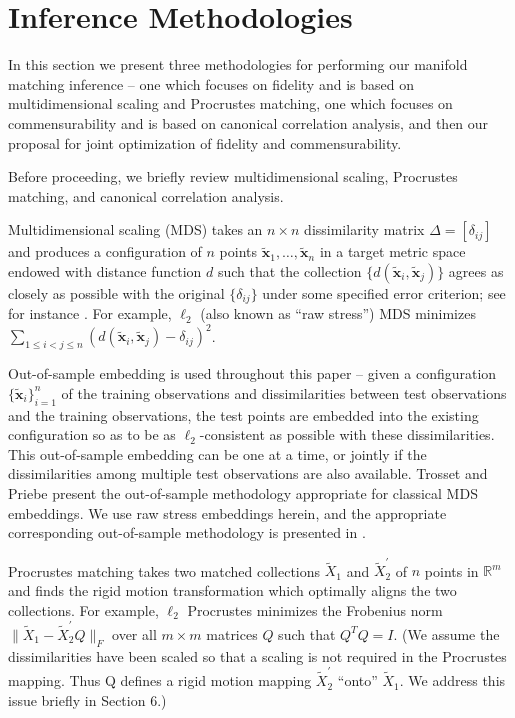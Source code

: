 \documentclass[12pt,xcolor]{article}
\newcommand{\1}{\ensuremath{\mbox{{\bf 1}}}}
\begin{document}
\section{Inference Methodologies}

In this section we present three methodologies for performing our manifold matching inference --
one which focuses on fidelity and is based on multidimensional scaling
and Procrustes matching, one which focuses on commensurability and is based on canonical correlation analysis,
and then our proposal for joint optimization of fidelity and commensurability.

Before proceeding, we briefly review multidimensional scaling, Procrustes matching, and canonical correlation analysis.

Multidimensional scaling (MDS) takes an $n \times n$ dissimilarity matrix $\Delta=[\delta_{ij}]$
and produces a configuration of $n$ points $\widetilde{\bm{x}}_1,\ldots,\widetilde{\bm{x}}_n$ in a target metric space endowed with distance function $d$
such that the collection $\{d(\widetilde{\bm{x}}_i,\widetilde{\bm{x}}_j)\}$ agrees as closely as possible with the original $\{\delta_{ij}\}$
under some specified error criterion; see for instance \cite{T52,T58,CC01,BG05}.
For example, $\ell_2$ (also known as ``raw stress'') MDS minimizes
$\sum_{1 \leq i < j \leq n} (d(\widetilde{\bm{x}}_{i},\widetilde{\bm{x}}_{j})-\delta_{ij})^2$.

Out-of-sample embedding is used throughout this paper -- given a configuration $\{\widetilde{\bm{x}}_i\}_{i=1}^n$
of the training observations
and dissimilarities between test observations and the training observations, the test points are embedded
into the existing configuration so as to be as $\ell_2$-consistent as possible with these dissimilarities.
This out-of-sample embedding can be one at a time, or jointly if the dissimilarities among multiple test observations are also available.
Trosset and Priebe \cite{TP-CSDA-2008-oos} present the out-of-sample methodology appropriate for classical MDS embeddings.
We use raw stress embeddings herein, and the appropriate corresponding out-of-sample methodology is presented in \cite{MPoos}.

Procrustes matching \cite{procrustes1,procrustes2,procrustes3,procrustes4}
takes two matched collections $\widetilde{X}_1$ and $\widetilde{X}^{\prime}_2$ of $n$ points in $\mathbb{R}^m$
and finds the rigid motion transformation which optimally aligns the two collections.
For example, $\ell_2$ Procrustes minimizes the Frobenius norm $\|\widetilde{X}_1 - \widetilde{X}^{\prime}_2Q\|_F$ over all $m \times m$ matrices $Q$ such that $Q^TQ = I$.
(We assume the dissimilarities have been scaled so that a
scaling is not required in the Procrustes mapping.
Thus Q defines a rigid motion mapping $\widetilde{X}^{\prime}_2$ ``onto'' $\widetilde{X}_1$.
We address this issue briefly in Section 6.)
\end{document}
